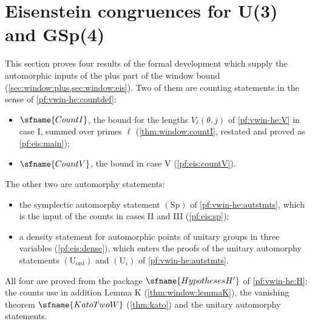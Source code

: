 \section{Eisenstein congruences for U(3) and GSp(4)}\label{sec:pf:eis}

\providecommand{\eisQZ}{\Q_\ell/\Z_\ell}
\providecommand{\eiscyc}{\chi_{\mathrm{cyc}}}
\providecommand{\eisVt}{\widetilde V}
\providecommand{\eisX}{\mathcal X}
\providecommand{\eisGG}{\mathcal G_3}
\providecommand{\eisv}{v_\ell}
\providecommand{\eisrz}{r_0}
\providecommand{\eiseis}{\mathrm{eis}}
\providecommand{\eistr}{\delta}
\providecommand{\eiscot}{\lambda^{\mathrm{cot}}}
\providecommand{\eisKill}{\mathcal N}

This section proves four results of the formal development \cite{LeanSource2026} which supply the automorphic
inputs of the plus part of the window bound (\cref{sec:window:plus,sec:window:eis}). Two of them are counting
statements in the sense of \cref{pf:vwin-he:countdef}:
\begin{itemize}
\item $\sfname{CountI}$, the bound for the lengths $V_\ell(\theta,j)$ of \cref{pf:vwin-he:V} in case I, summed over
  primes $\ell$ (\cref{thm:window:countI}, restated and proved as \cref{pf:eis:main});
\item $\sfname{CountV}$, the bound in case V (\cref{pf:eis:countV}).
\end{itemize}
The other two are automorphy statements:
\begin{itemize}
\item the symplectic automorphy statement $(\mathrm{Sp})$ of \cref{pf:vwin-he:autstmts}, which is the input of the
  counts in cases II and III (\cref{pf:eis:sp});
\item a density statement for automorphic points of unitary groups in three variables
  (\cref{pf:eis:dense}), which enters the proofs of the unitary automorphy statements $(\mathrm{U}_{\mathrm{ord}})$
  and $(\mathrm{U}_i)$ of \cref{pf:vwin-he:autstmts}.
\end{itemize}
All four are proved from the package $\sfname{HypothesesH'}$ of \cref{pf:vwin-he:H}; the counts use in addition
Lemma K (\cref{thm:window:lemmaK}), the vanishing theorem $\sfname{KatoTwoW}$ (\cref{thm:kato}) and the unitary
automorphy statements.

